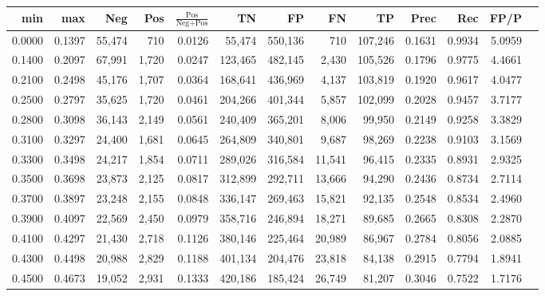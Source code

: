 \begin{tabular}{rrrrrrrrrrrrr}
\toprule
   min &    max &    Neg &   Pos & $\frac{\text{Pos}}{\text{Neg}+\text{Pos}}$ &      TN &      FP &      FN &      TP &   Prec &    Rec &   FP/P \\
\midrule
0.0000 & 0.1397 & 55,474 &   710 &                                     0.0126 &  55,474 & 550,136 &     710 & 107,246 & 0.1631 & 0.9934 & 5.0959 \\
0.1400 & 0.2097 & 67,991 & 1,720 &                                     0.0247 & 123,465 & 482,145 &   2,430 & 105,526 & 0.1796 & 0.9775 & 4.4661 \\
0.2100 & 0.2498 & 45,176 & 1,707 &                                     0.0364 & 168,641 & 436,969 &   4,137 & 103,819 & 0.1920 & 0.9617 & 4.0477 \\
0.2500 & 0.2797 & 35,625 & 1,720 &                                     0.0461 & 204,266 & 401,344 &   5,857 & 102,099 & 0.2028 & 0.9457 & 3.7177 \\
0.2800 & 0.3098 & 36,143 & 2,149 &                                     0.0561 & 240,409 & 365,201 &   8,006 &  99,950 & 0.2149 & 0.9258 & 3.3829 \\
0.3100 & 0.3297 & 24,400 & 1,681 &                                     0.0645 & 264,809 & 340,801 &   9,687 &  98,269 & 0.2238 & 0.9103 & 3.1569 \\
0.3300 & 0.3498 & 24,217 & 1,854 &                                     0.0711 & 289,026 & 316,584 &  11,541 &  96,415 & 0.2335 & 0.8931 & 2.9325 \\
0.3500 & 0.3698 & 23,873 & 2,125 &                                     0.0817 & 312,899 & 292,711 &  13,666 &  94,290 & 0.2436 & 0.8734 & 2.7114 \\
0.3700 & 0.3897 & 23,248 & 2,155 &                                     0.0848 & 336,147 & 269,463 &  15,821 &  92,135 & 0.2548 & 0.8534 & 2.4960 \\
0.3900 & 0.4097 & 22,569 & 2,450 &                                     0.0979 & 358,716 & 246,894 &  18,271 &  89,685 & 0.2665 & 0.8308 & 2.2870 \\
0.4100 & 0.4297 & 21,430 & 2,718 &                                     0.1126 & 380,146 & 225,464 &  20,989 &  86,967 & 0.2784 & 0.8056 & 2.0885 \\
0.4300 & 0.4498 & 20,988 & 2,829 &                                     0.1188 & 401,134 & 204,476 &  23,818 &  84,138 & 0.2915 & 0.7794 & 1.8941 \\
0.4500 & 0.4673 & 19,052 & 2,931 &                                     0.1333 & 420,186 & 185,424 &  26,749 &  81,207 & 0.3046 & 0.7522 & 1.7176 \\

\end{tabular}
